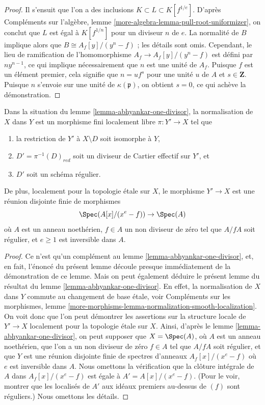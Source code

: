 \begin{proof}
\medskip\noindent
Il s'ensuit que l'on a des inclusions $K \subset L \subset K[f^{1/e}]$.
D'après Compléments sur l'algèbre, lemme \ref{more-algebra-lemma-pull-root-uniformizer},
on conclut que $L$ est égal à $K[f^{1/n}]$ pour un diviseur $n$ de $e$.
La normalité de $B$ implique alors que $B \cong A_f[y]/(y^n - f)$ ; les détails
sont omis.
Cependant, le lieu de ramification de l'homomorphisme $A_f \to A_f[y]/(y^n - f)$
est défini par $ny^{n - 1}$, ce qui implique nécessairement que $n$ est une unité de $A_f$.
Puisque $f$ est un élément premier, cela signifie que $n = u f^s$ pour
une unité $u$ de $A$ et $s \in \mathbf{Z}$. Puisque $n$ s'envoie sur une unité de
$\kappa(\mathfrak p)$, on obtient $s = 0$, ce qui achève la démonstration.
\end{proof}

\begin{lemma}
\label{lemma-extend-tame-covering-normal}
Dans la situation du lemme \ref{lemma-abhyankar-one-divisor},
la normalisation de $X$ dans $Y$ est un morphisme fini localement libre
$\pi : Y' \to X$ tel que
\begin{enumerate}
\item la restriction de $Y'$ à $X \setminus D$ soit isomorphe à $Y$,
\item $D' = \pi^{-1}(D)_{red}$ soit un diviseur de Cartier effectif sur $Y'$, et
\item $D'$ soit un schéma régulier.
\end{enumerate}
De plus, localement pour la topologie \'etale sur $X$, le morphisme $Y' \to X$ est une réunion
disjointe finie de morphismes
$$
\Spec(A[x]/(x^e - f)) \to \Spec(A)
$$
où $A$ est un anneau noethérien, $f \in A$ un non diviseur de zéro tel que
$A/fA$ soit régulier, et $e \geq 1$ est inversible dans $A$.
\end{lemma}

\begin{proof}
Ce n'est qu'un complément au lemme \ref{lemma-abhyankar-one-divisor},
et, en fait, l'énoncé du présent lemme découle presque immédiatement de
la démonstration de ce lemme. Mais on peut également déduire
le présent lemme du résultat du lemme \ref{lemma-abhyankar-one-divisor}.
En effet, la normalisation de $X$ dans $Y$ commute au
changement de base \'etale, voir Compléments sur les morphismes, lemme
\ref{more-morphisms-lemma-normalization-smooth-localization}.
On voit donc que l'on peut démontrer les assertions sur la structure locale
de $Y' \to X$ localement pour la topologie \'etale sur $X$. Ainsi, d'après le
lemme \ref{lemma-abhyankar-one-divisor}, on peut supposer que
$X = \Spec(A)$, où $A$ est un anneau noethérien, que l'on a un
non diviseur de zéro $f\in A$ tel que $A/fA$ soit régulier, et que $Y$
est une réunion disjointe finie de spectres d'anneaux $A_f[x]/(x^e - f)$
où $e$ est inversible dans $A$. Nous omettons la vérification que
la clôture intégrale de $A$ dans $A_f[x]/(x^e - f)$ est
égale à $A' = A[x]/(x^e - f)$. (Pour le voir, montrer que
les localisés de $A'$ aux idéaux premiers au-dessus de $(f)$ sont réguliers.)
Nous omettons les détails.
\end{proof}

